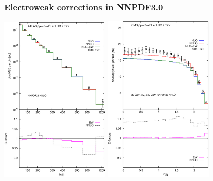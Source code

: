 \documentclass[10pt]{beamer}
\begin{document}
\begin{frame}
    \begin{center}
\frametitle{Electroweak corrections in NNPDF3.0}
      \includegraphics[width=0.4\textwidth]{figures/atlasHM.eps}
      \includegraphics[width=0.4\textwidth]{figures/bin1cms.eps}
    \end{center}
\end{frame}


\end{document}
